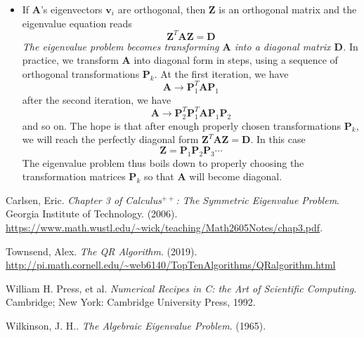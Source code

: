 \documentclass[11pt, a4paper]{article}
\newcommand{\mat}[1]{\mathbf{#1}}
\renewcommand{\vec}[1]{\bm{#1}}
\begin{document}
\begin{itemize}
	\item If $ \mat{A} $'s eigenvectors $ \vec{v}_{i} $ are orthogonal, then $ \mat{Z} $ is an orthogonal matrix and the eigenvalue equation reads
	\begin{equation*}
		\mat{Z}^{T}\mat{A}\mat{Z} = \mat{D}
	\end{equation*}
	\textit{The eigenvalue problem becomes transforming $ \mat{A} $ into a diagonal matrix $ \mat{D} $.}
	In practice, we transform $ \mat{A} $ into diagonal form in steps, using a sequence of orthogonal transformations $ \mat{P}_{k} $. At the first iteration, we have
	\begin{equation*}
		\mat{A} \to \mat{P}_{1}^{T}\mat{A}\mat{P}_{1}
	\end{equation*}
	after the second iteration, we have
	\begin{equation*}
		\mat{A} \to \mat{P}_{2}^{T}\mat{P}_{1}^{T}\mat{A}\mat{P}_{1}\mat{P}_{2}
	\end{equation*}
	and so on. The hope is that after enough properly chosen transformations $ \mat{P}_{k} $, we will reach the perfectly diagonal form $ \mat{Z}^{T}\mat{A}\mat{Z} = \mat{D} $. In this case
	\begin{equation*}
		\mat{Z} = \mat{P}_{1}\mat{P}_{2}\mat{P}_{3}\cdots
	\end{equation*}
	The eigenvalue problem thus boils down to properly choosing the transformation matrices $ \mat{P}_{k} $ so that $ \mat{A} $ will become diagonal.
	
\end{itemize}
\fi

\begin{thebibliography}{}
\setlength{\itemsep}{.2\itemsep}\setlength{\parsep}{.5\parsep}

 Carlsen, Eric. \textit{Chapter 3 of Calculus$^{++}$: The Symmetric Eigenvalue Problem}. Georgia Institute of Technology. (2006). \url{https://www.math.wustl.edu/~wick/teaching/Math2605Notes/chap3.pdf}.

 Townsend, Alex. \textit{The QR Algorithm}. (2019). \url{http://pi.math.cornell.edu/~web6140/TopTenAlgorithms/QRalgorithm.html}

 William H. Press, et al. \textit{Numerical Recipes in C: the Art of Scientific Computing}. Cambridge; New York: Cambridge University Press, 1992.

 Wilkinson, J. H.. \textit{The Algebraic Eigenvalue Problem}. (1965).


\end{thebibliography}
\end{document}
